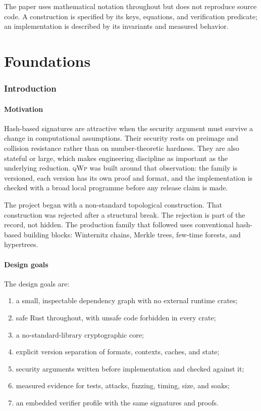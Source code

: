 \documentclass[11pt,a4paper]{article}
\theoremstyle{remark}
\newcommand{\qwp}{\textsc{qWp}}
\begin{document}
The paper uses mathematical notation throughout but does not reproduce source
code. A construction is specified by its keys, equations, and verification
predicate; an implementation is described by its invariants and measured
behavior.

\part{Foundations}

\section{Introduction}

\subsection{Motivation}

Hash-based signatures are attractive when the security argument must survive a
change in computational assumptions. Their security rests on preimage and
collision resistance rather than on number-theoretic hardness. They are also
stateful or large, which makes engineering discipline as important as the
underlying reduction. \qwp{} was built around that observation: the family is
versioned, each version has its own proof and format, and the implementation is
checked with a broad local programme before any release claim is made.

The project began with a non-standard topological construction. That
construction was rejected after a structural break. The rejection is part of
the record, not hidden. The production family that followed uses conventional
hash-based building blocks: Winternitz chains, Merkle trees, few-time forests,
and hypertrees.

\subsection{Design goals}

The design goals are:

\begin{enumerate}
  \item a small, inspectable dependency graph with no external runtime crates;
  \item safe Rust throughout, with unsafe code forbidden in every crate;
  \item a no-standard-library cryptographic core;
  \item explicit version separation of formats, contexts, caches, and state;
  \item security arguments written before implementation and checked against it;
  \item measured evidence for tests, attacks, fuzzing, timing, size, and soaks;
  \item an embedded verifier profile with the same signatures and proofs.
\end{enumerate}
\end{document}
